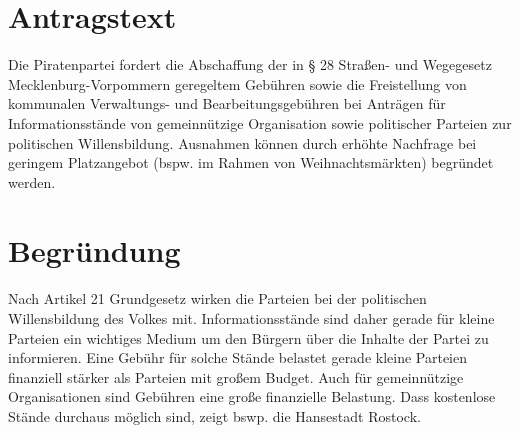 \section{Antragstext}

Die Piratenpartei fordert die Abschaffung der in § 28 Straßen- und Wegegesetz Mecklenburg-Vorpommern geregeltem Gebühren sowie die Freistellung von kommunalen Verwaltungs- und Bearbeitungsgebühren bei Anträgen für Informationsstände von gemeinnützige Organisation sowie politischer Parteien zur politischen Willensbildung. Ausnahmen können durch erhöhte Nachfrage bei geringem Platzangebot (bspw. im Rahmen von Weihnachtsmärkten) begründet werden.

\section{Begründung}

Nach Artikel 21 Grundgesetz wirken die Parteien bei der politischen Willensbildung des Volkes mit. Informationsstände sind daher gerade für kleine Parteien ein wichtiges Medium um den Bürgern über die Inhalte der Partei zu informieren. Eine Gebühr für solche Stände belastet gerade kleine Parteien finanziell stärker als Parteien mit großem Budget. Auch für gemeinnützige Organisationen sind Gebühren eine große finanzielle Belastung. Dass kostenlose Stände durchaus möglich sind, zeigt bswp. die Hansestadt Rostock.
